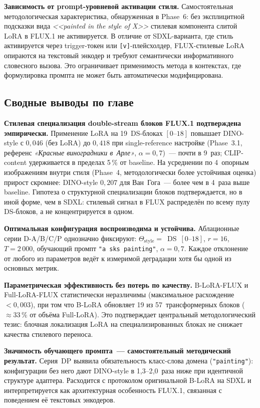 \textbf{Зависимость от prompt-уровневой активации стиля.} Самостоятельная методологическая характеристика, обнаруженная в Phase~6: без эксплицитной подсказки вида \textit{<<painted in the style of X>>} стилевая компонента слитой LoRA в FLUX.1 не активируется. В отличие от SDXL-варианта, где стиль активируется через trigger-токен или \texttt{[v]}-плейсхолдер, FLUX-стилевые LoRA опираются на текстовый энкодер и требуют семантически информативного словесного вызова. Это ограничивает применимость метода в контекстах, где формулировка промпта не может быть автоматически модифицирована.

\subsection{Сводные выводы по главе}
\label{sec:results_summary}

\textbf{Стилевая специализация double-stream блоков FLUX.1 подтверждена эмпирически.} Применение LoRA на 19~DS-блоках $[0\text{--}18]$ повышает DINO-style с $0{,}046$ (без LoRA) до $0{,}418$ при single-reference настройке (Phase~3.1, референс \textit{«Красные виноградники в~Арле»}, $\alpha{=}0{,}7$)~--- почти в 9~раз; CLIP-content удерживается в пределах 5\,\% от baseline. На усреднении по 4~опорным изображениям внутри стиля (Phase~4, методологически более устойчивая оценка) прирост скромнее: DINO-style $0{,}207$ для Ван~Гога~--- более чем в 4~раза выше baseline. Гипотеза о структурной специализации блоков подтверждается, но в иной форме, чем в SDXL: стилевый сигнал в FLUX распределён по всему пулу DS-блоков, а не концентрируется в одном.

\textbf{Оптимальная конфигурация воспроизводима и устойчива.} Аблационные серии D-A/B/C/P однозначно фиксируют: $\Theta_\text{style}{=}$~DS~$[0\text{--}18]$, $r{=}16$, $T{=}2\,000$, обучающий промпт \texttt{"a sks painting"}, $\alpha{=}0{,}7$. Каждое отклонение от любого из параметров ведёт к измеримой деградации хотя бы одной из основных метрик.

\textbf{Параметрическая эффективность без потерь по качеству.} B-LoRA-FLUX и Full-LoRA-FLUX статистически неразличимы (максимальное расхождение $<0{,}003$), при том что B-LoRA обновляет 19 из 57~трансформерных блоков ($\approx 33\,\%$ от объёма Full-LoRA). Это подтверждает центральный методологический тезис: блочная локализация LoRA на специализированных блоках не снижает качества стилевого переноса.

\textbf{Значимость обучающего промпта~--- самостоятельный методический результат.} Серия~DP выявила обязательность класс-слова домена (\texttt{"painting"}): конфигурации без него дают DINO-style в 1{,}3--2{,}0~раза ниже при идентичной структуре адаптера. Расходится с протоколом оригинальной B-LoRA на SDXL и интерпретируется как архитектурная особенность FLUX.1, связанная с поведением её текстовых энкодеров.

